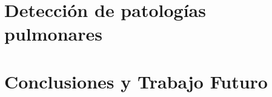 \documentclass[12pt, oneside]{book}
\begin{document}
\chapter{Detección de patologías pulmonares}


\chapter{Conclusiones y Trabajo Futuro}


\appendix


% 

% 





\end{document}
